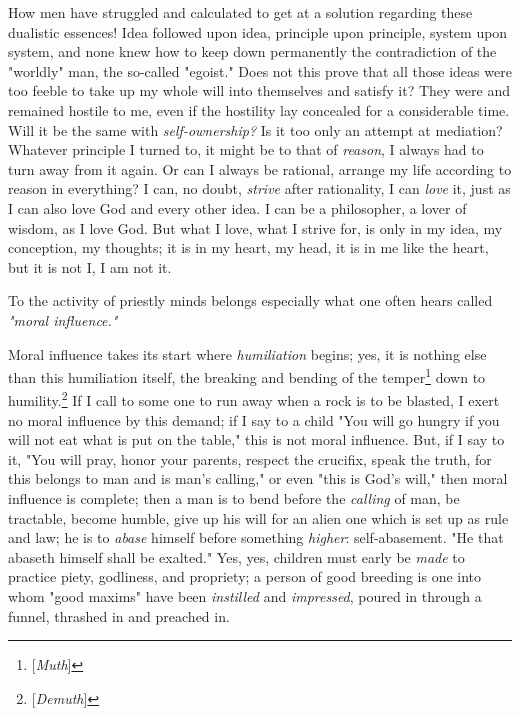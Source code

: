 \documentclass[a4paper]{book}
\begin{document}
How men have struggled and calculated to get at a solution regarding these 
dualistic essences! Idea followed upon idea, principle upon principle, system 
upon system, and none knew how to keep down permanently the contradiction of 
the "{}worldly"{} man, the so-called "{}egoist."{} Does not this prove that 
all those ideas were too feeble to take up my whole will into themselves and 
satisfy it? They were and remained hostile to me, even if the hostility lay 
concealed for a considerable time. Will it be the same with 
\textit{self-ownership?} Is it too only an attempt at mediation? Whatever 
principle I turned to, it might be to that of \textit{reason}, I always had to 
turn away from it again. Or can I always be rational, arrange my life 
according to reason in everything? I can, no doubt, \textit{strive} after 
rationality, I can \textit{love} it, just as I can also love God and every 
other idea. I can be a philosopher, a lover of wisdom, as I love God. But what 
I love, what I strive for, is only in my idea, my conception, my thoughts; it 
is in my heart, my head, it is in me like the heart, but it is not I, I am not 
it.

To the activity of priestly minds belongs especially what one often hears 
called \textit{"{}moral influence."{}}

Moral influence takes its start where \textit{humiliation} begins; yes, it is 
nothing else than this humiliation itself, the breaking and bending of the 
temper\footnote{[\textit{Muth}]} down to humility.\footnote{[\textit{Demuth}]} 
If I call to some one to run away when a rock is to be blasted, I exert no 
moral influence by this demand; if I say to a child "{}You will go hungry if 
you will not eat what is put on the table,"{} this is not moral influence. 
But, if I say to it, "{}You will pray, honor your parents, respect the 
crucifix, speak the truth, for this belongs to man and is man's calling,"{} or 
even "{}this is God's will,"{} then moral influence is complete; then a man is 
to bend before the \textit{calling} of man, be tractable, become humble, give 
up his will for an alien one which is set up as rule and law; he is to 
\textit{abase} himself before something \textit{higher}: self-abasement. "{}He 
that abaseth himself shall be exalted."{} Yes, yes, children must early be 
\textit{made} to practice piety, godliness, and propriety; a person of good 
breeding is one into whom "{}good maxims"{} have been \textit{instilled} and 
\textit{impressed}, poured in through a funnel, thrashed in and preached in.
\end{document}
